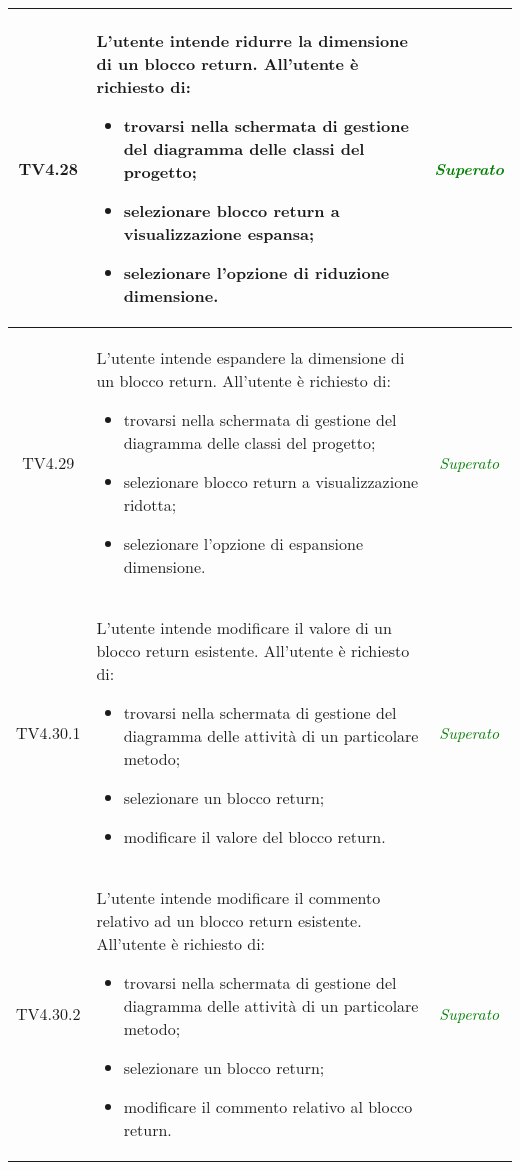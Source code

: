 \begin{longtable}{|c|>{}m{8cm}|c|}
\hypertarget{TV4.28}{TV4.28} & L'utente intende ridurre la dimensione di un blocco return.
All'utente è richiesto di:
\begin{itemize}
	\item trovarsi nella schermata di gestione del diagramma delle classi del progetto;
	\item selezionare blocco return a visualizzazione espansa;
	\item selezionare l'opzione di riduzione dimensione.
\end{itemize} & \textcolor{Green}{\textit{Superato}}\\ \hline

\hypertarget{TV4.29}{TV4.29} & L'utente intende espandere la dimensione di un blocco return.
All'utente è richiesto di:
\begin{itemize}
	\item trovarsi nella schermata di gestione del diagramma delle classi del progetto;
	\item selezionare blocco return a visualizzazione ridotta;
	\item selezionare l'opzione di espansione dimensione.
\end{itemize} & \textcolor{Green}{\textit{Superato}}\\ \hline

\hypertarget{TV4.30.1}{TV4.30.1} & L'utente intende modificare il valore di un blocco return esistente.
All'utente è richiesto di:
\begin{itemize}
	\item trovarsi nella schermata di gestione del diagramma delle attività di un particolare metodo;
	\item selezionare un blocco return;
	\item modificare il valore del blocco return.
\end{itemize} & \textcolor{Green}{\textit{Superato}}\\ \hline

\hypertarget{TV4.30.2}{TV4.30.2} & L'utente intende modificare il commento relativo ad un blocco return esistente.
All'utente è richiesto di:
\begin{itemize}
	\item trovarsi nella schermata di gestione del diagramma delle attività di un particolare metodo;
	\item selezionare un blocco return;
	\item modificare il commento relativo al blocco return.
\end{itemize} & \textcolor{Green}{\textit{Superato}}\\ \hline


\end{longtable}
